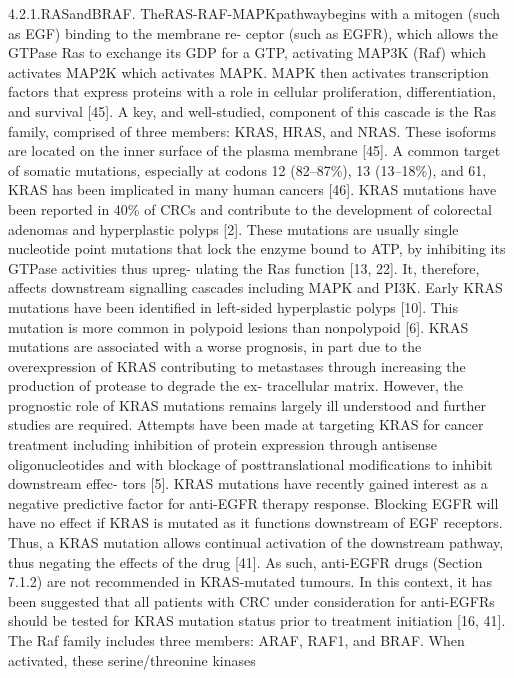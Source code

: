   4.2.1.RASandBRAF. TheRAS-RAF-MAPKpathwaybegins with a mitogen (such as EGF)
    binding to the membrane re- ceptor (such as EGFR), which allows the GTPase Ras
    to exchange its GDP for a GTP, activating MAP3K (Raf) which activates MAP2K
    which activates MAPK. MAPK then activates transcription factors that express
    proteins with a role in cellular proliferation, differentiation, and survival
    [45]. A key, and well-studied, component of this cascade is the Ras family,
    comprised of three members: KRAS, HRAS, and NRAS. These isoforms are located on
    the inner surface of the plasma membrane [45]. A common target of somatic
    mutations, especially at codons 12 (82–87\%), 13 (13–18\%), and 61, KRAS has
    been implicated in many human cancers [46]. KRAS mutations have been reported in
    40\% of CRCs and contribute to the development of colorectal adenomas and
    hyperplastic polyps [2]. These mutations are usually single nucleotide point
    mutations that lock the enzyme bound to ATP, by inhibiting its GTPase activities
    thus upreg- ulating the Ras function [13, 22]. It, therefore, affects downstream
    signalling cascades including MAPK and PI3K. Early KRAS mutations have been
    identified in left-sided hyperplastic polyps [10]. This mutation is more common
    in polypoid lesions than nonpolypoid [6]. KRAS mutations are associated with a
    worse prognosis, in part due to the overexpression of KRAS contributing to
    metastases through increasing the production of protease to degrade the ex-
    tracellular matrix. However, the prognostic role of KRAS mutations remains
    largely ill understood and further studies are required. Attempts have been made
    at targeting KRAS for cancer treatment including inhibition of protein
    expression through antisense oligonucleotides and with blockage of
    posttranslational modifications to inhibit downstream effec- tors [5]. KRAS
    mutations have recently gained interest as a negative predictive factor for
    anti-EGFR therapy response. Blocking EGFR will have no effect if KRAS is mutated
    as it functions downstream of EGF receptors. Thus, a KRAS mutation allows
    continual activation of the downstream pathway, thus negating the effects of the
    drug [41]. As such, anti-EGFR drugs (Section 7.1.2) are not recommended in
    KRAS-mutated tumours. In this context, it has been suggested that all patients
    with CRC under consideration for anti-EGFRs should be tested for KRAS mutation
    status prior to treatment initiation [16, 41]. The Raf family includes three
    members: ARAF, RAF1, and BRAF. When activated, these serine/threonine kinases
